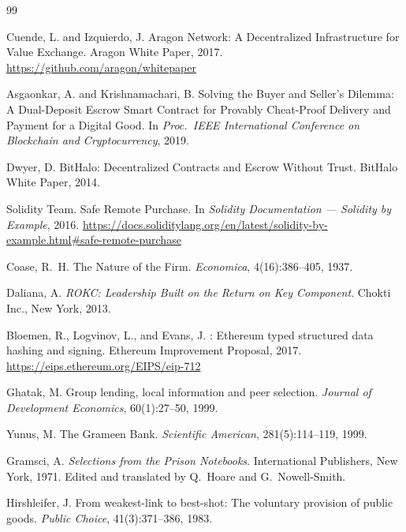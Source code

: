 \documentclass[11pt,a4paper]{article}
\theoremstyle{definition}
\theoremstyle{remark}
\begin{document}
\begin{thebibliography}{99}

Cuende, L. and Izquierdo, J.
\newblock Aragon Network: A Decentralized Infrastructure for Value Exchange.
\newblock Aragon White Paper, 2017.
\newblock \url{https://github.com/aragon/whitepaper}

Asgaonkar, A. and Krishnamachari, B.
\newblock Solving the Buyer and Seller's Dilemma: A Dual-Deposit Escrow Smart
  Contract for Provably Cheat-Proof Delivery and Payment for a Digital Good.
\newblock In \emph{Proc.\ IEEE International Conference on Blockchain and
  Cryptocurrency}, 2019.

Dwyer, D.
\newblock BitHalo: Decentralized Contracts and Escrow Without Trust.
\newblock BitHalo White Paper, 2014.

Solidity Team.
\newblock Safe Remote Purchase.
\newblock In \emph{Solidity Documentation --- Solidity by Example}, 2016.
\newblock \url{https://docs.soliditylang.org/en/latest/solidity-by-example.html#safe-remote-purchase}

Coase, R.~H.
\newblock The Nature of the Firm.
\newblock \emph{Economica}, 4(16):386--405, 1937.

Daliana, A.
\newblock \emph{ROKC: Leadership Built on the Return on Key Component}.
\newblock Chokti Inc., New York, 2013.

Bloemen, R., Logvinov, L., and Evans, J.
: Ethereum typed structured data hashing and signing.
\newblock Ethereum Improvement Proposal, 2017.
\newblock \url{https://eips.ethereum.org/EIPS/eip-712}

Ghatak, M.
\newblock Group lending, local information and peer selection.
\newblock \emph{Journal of Development Economics}, 60(1):27--50, 1999.

Yunus, M.
\newblock The Grameen Bank.
\newblock \emph{Scientific American}, 281(5):114--119, 1999.

Gramsci, A.
\newblock \emph{Selections from the Prison Notebooks}.
\newblock International Publishers, New York, 1971.
\newblock Edited and translated by Q.~Hoare and G.~Nowell-Smith.

Hirshleifer, J.
\newblock From weakest-link to best-shot: The voluntary provision of public
  goods.
\newblock \emph{Public Choice}, 41(3):371--386, 1983.


\end{thebibliography}
\end{document}
